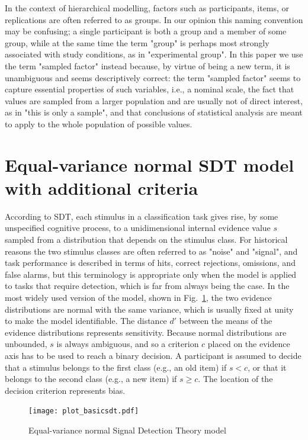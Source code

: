 \documentclass[a4paper,man,apacite,floatsintext]{apa6}
\begin{document}
In the context of hierarchical modelling, factors such as
participants, items, or replications are often referred to as
groups. In our opinion this naming convention may be confusing; a
single participant is both a group and a member of some group, while
at the same time the term "group" is perhaps most strongly associated
with study conditions, as in "experimental group". In this paper we
use the term "sampled factor" instead because, by virtue of being a
new term, it is unambiguous and seems descriptively correct: the term
"sampled factor" seems to capture essential properties of such
variables, i.e., a nominal scale, the fact that values are sampled
from a larger population and are usually not of direct interest, as in
"this is only a sample", and that conclusions of statistical analysis
are meant to apply to the whole population of possible values.

\section{Equal-variance normal SDT model with additional criteria}

According to SDT, each stimulus in a classification task gives rise,
by some unspecified cognitive process, to a unidimensional internal
evidence value $s$ sampled from a distribution that depends on the
stimulus class. For historical reasons the two stimulus classes are
often referred to as "noise" and "signal", and task performance is
described in terms of hits, correct rejections, omissions, and false
alarms, but this terminology is appropriate only when the model is
applied to tasks that require detection, which is far from always
being the case. In the most widely used version of the model, shown in
Fig.~\ref{basicsdt}, the two evidence distributions are normal with
the same variance, which is usually fixed at unity to make the model
identifiable. The distance $d'$ between the means of the evidence
distributions represents sensitivity. Because normal distributions are
unbounded, $s$ is always ambiguous, and so a criterion $c$ placed on
the evidence axis has to be used to reach a binary decision. A
participant is assumed to decide that a stimulus belongs to the first
class (e.g., an old item) if $s < c$, or that it belongs to the second
class (e.g., a new item) if $s \geq c$. The location of the decision
criterion represents bias.

\begin{figure}[H]
  \centering
  \texttt{[image: plot\_basicsdt.pdf]}
  \caption{Equal-variance normal Signal Detection Theory model}
  \label{basicsdt}
\end{figure}
\end{document}
